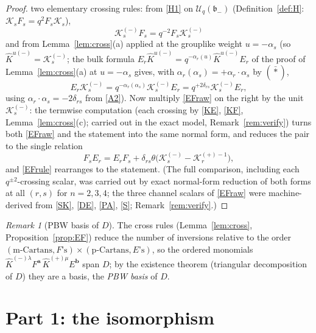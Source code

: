 \documentclass[11pt]{article}
\theoremstyle{definition}
\theoremstyle{remark}
\newtheorem{remark}[theorem]{Remark}
\newcommand{\Uq}{\mathcal{U}_q}
\newcommand{\bm}{\mathfrak{b}_-}
\newcommand{\del}{\delta}
\newcommand{\hK}{\hat K}
\newcommand{\cK}{\mathcal K}
\newcommand{\tht}{\theta}
\begin{document}
\begin{proof}
two elementary crossing rules: from \eqref{H1} on $\Uq(\bm)$
(Definition~\ref{def:H}: $\cK_sF_s=q^{2}F_s\cK_s$),
\begin{equation}
\cK_s^{(-)}F_s=q^{-2}F_s\cK_s^{(-)}
\label{KF}\tag{KF}
\end{equation}
and from Lemma~\ref{lem:cross}(a) applied at the grouplike weight
$u=-\alpha_s$ (so $\hK^{u(-)}=\cK_s^{(-)}$; the bulk formula
$E_r\hK^{u(-)}=q^{-\alpha_r(u)}\hK^{u(-)}E_r$ of the proof of
Lemma~\ref{lem:cross}(a) at $u=-\alpha_s$ gives, with
$\alpha_r(\alpha_s)=+\alpha_r\cdot\alpha_s$ by $(\bar\ast)$,
\begin{equation}
E_r\cK_s^{(-)}=q^{-\alpha_r(\alpha_s)}\cK_s^{(-)}E_r
 =q^{+2\del_{rs}}\cK_s^{(-)}E_r ,
\label{KE}\tag{KE}
\end{equation}
using $\alpha_r\cdot\alpha_s=-2\del_{rs}$ from \eqref{A2}).
Now multiply \eqref{EFraw} on the right by the unit $\cK_s^{(-)}$:
the termwise computation (each crossing by \eqref{KE}, \eqref{KF},
Lemma~\ref{lem:cross}(c); carried out in the exact model,
Remark~\ref{rem:verify}) turns both \eqref{EFraw} and the statement
into the same normal form, and reduces the pair to the single
relation
\begin{equation}
F_sE_r=E_rF_s+\del_{rs}\tht\bigl(\cK_s^{(-)}-\cK_r^{(+)-1}\bigr),
\label{EFrule}\tag{EF$'$}
\end{equation}
and \eqref{EFrule} rearranges to the statement.  (The full
comparison, including each $q^{\pm2}$-crossing scalar, was carried
out by exact normal-form reduction of both forms at all $(r,s)$ for
$n=2,3,4$; the three channel scalars of \eqref{EFraw} were
machine-derived from \eqref{SK}, \eqref{DE}, \eqref{PA}, \eqref{S};
Remark~\ref{rem:verify}.)
\end{proof}

\begin{remark}[PBW basis of $D$]\label{rem:pbwD}
The cross rules (Lemma~\ref{lem:cross},
Proposition~\ref{prop:EF}) reduce the number of inversions relative to
the order $(\text{m-Cartans},F\text{'s})\times
(\text{p-Cartans},E\text{'s})$, so the ordered monomials
$\hK^{(-)\lambda}F^{\mathbf a}\,\hK^{(+)\mu}E^{\mathbf b}$ span $D$;
by the existence theorem (triangular decomposition of $D$) they are a
basis, the \emph{PBW basis} of $D$.
\end{remark}

\section{Part 1: the isomorphism}\label{sec:p1}
\end{document}
